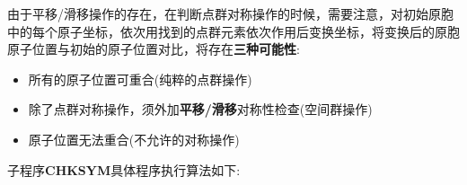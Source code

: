 \documentclass{article}      %
\begin{document}
由于平移/滑移操作的存在，在判断点群对称操作的时候，需要注意，对初始原胞中的每个原子坐标，依次用找到的点群元素依次作用后变换坐标，将变换后的原胞原子位置与初始的原子位置对比，将存在\textbf{三种可能性}:
\begin{itemize}
	\item 所有的原子位置可重合(纯粹的点群操作)
	\item 除了点群对称操作，须外加\textbf{平移/滑移}对称性检查(空间群操作)
	\item 原子位置无法重合(不允许的对称操作)
\end{itemize}
子程序\textbf{CHKSYM}具体程序执行算法如下:
\end{document}
